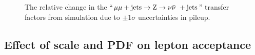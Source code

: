 \begin{figure}[!h]
{  } \\
   ~
  \caption{\label{fig:tfSyst_pu_mmZinv} The relative change in the
    ``$\mu\mu + \textrm{jets} \rightarrow {\text Z} \rightarrow \nu\bar{\nu}\ + \textrm{jets}$'' transfer factors from
    simulation due to $\pm1\sigma$ uncertainties in pileup.  }
\end{figure}

\clearpage
\subsection{Effect of scale and PDF on lepton acceptance}

